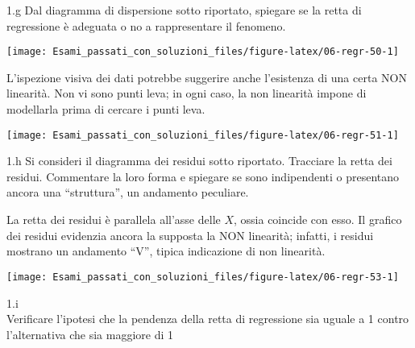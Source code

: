 \documentclass[
  11pt,
]{book}
\theoremstyle{mytheoremstyle}
\theoremstyle{mydefstyle}
\newenvironment{sol}
  {
  \begin{tcolorbox}[enhanced,breakable,arc=0.1mm,boxrule=1pt,colback=white,colframe=iblue,
  title=\bf \fontfamily{lmss}\selectfont \hspace{.5 cm} Soluzione,drop fuzzy shadow]

}{
\end{tcolorbox}
  }
\begin{document}
1.g Dal diagramma di dispersione sotto riportato,
spiegare se la retta di regressione è adeguata o no a
rappresentare il fenomeno.

\begin{center}\texttt{[image: Esami\_passati\_con\_soluzioni\_files/figure-latex/06-regr-50-1]} \end{center}

\begin{sol}

L'ispezione visiva dei dati potrebbe suggerire anche l'esistenza
di una certa NON linearità.
Non vi sono punti leva; in ogni caso, la non linearità impone
di modellarla prima di cercare i punti leva.

\begin{center}\texttt{[image: Esami\_passati\_con\_soluzioni\_files/figure-latex/06-regr-51-1]} \end{center}

\end{sol}

1.h Si consideri il diagramma dei residui sotto riportato.
Tracciare la retta dei residui.
Commentare la loro forma e spiegare se sono indipendenti o presentano
ancora una ``struttura'', un andamento peculiare.

\begin{sol}

La retta dei residui è parallela all'asse delle \(X\), ossia coincide con esso.
Il grafico dei residui evidenzia ancora la supposta la NON linearità;
infatti, i residui mostrano un andamento ``V'', tipica indicazione di
non linearità.

\begin{center}\texttt{[image: Esami\_passati\_con\_soluzioni\_files/figure-latex/06-regr-53-1]} \end{center}

\end{sol}

1.i\\
Verificare
l'ipotesi che la pendenza della retta di regressione sia uguale a
1 contro l'alternativa che sia maggiore di 1
\end{document}
